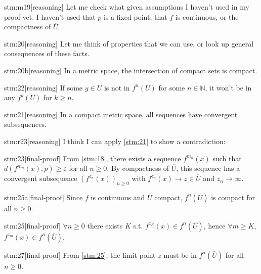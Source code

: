 \documentclass{article}
\begin{document}
\begin{stm}{stm:m19}[reasoning]
Let me check what given assumptions I haven't used in my proof yet. I haven't used that $p$ is a fixed point, that $f$ is continuous, or the compactness of $\overline{U}$.
\end{stm}

\begin{stm}{stm:20}[reasoning]
Let me think of properties that we can use, or look up general consequences of these facts.
\end{stm}

\begin{stm}{stm:20b}[reasoning]
 In a metric space, the intersection of compact sets is compact.
\end{stm}

\begin{stm}{stm:22}[reasoning]
    If some $y \in U$ is not in $f^n(U)$ for some $n \in \mathbb{N}$, it won't be in any $f^k(U)$ for $k \ge n$.
\end{stm}

\begin{stm}{stm:21}[reasoning]
In a compact metric space, all sequences have convergent subsequences.
\end{stm}

\begin{stm}{stm:r23}[reasoning]
I think I can apply \ref{stm:21} to show a contradiction: 
\end{stm}

\begin{stm}{stm:23}[final-proof]
From \ref{stm:18}, there exists a sequence $f^{m_n}(x)$ such that $d(f^{m_n}(x), p) \ge \varepsilon$ for all $n \ge 0$. By compactness of $\overline{U}$, this sequence has a convergent subsequence $(f^{z_n}(x))_{n \ge 0}$ with $f^{z_n}(x) \to z \in \overline{U}$ and $z_n \to \infty$.
\end{stm}

\begin{stm}{stm:25a}[final-proof]
Since $f$ is continuous and $\overline{U}$ compact, $f^n(\overline{U})$ is compact for all $n \ge 0$. 
\end{stm}

\begin{stm}{stm:25}[final-proof]
$\forall n \ge 0$ there exists $K$ s.t. $f^{z_K}(x) \in f^n(\overline{U})$, hence $\forall m \ge K$, $f^{z_m}(x) \in f^n(\overline{U})$.
\end{stm}

\begin{stm}{stm:27}[final-proof]
From \ref{stm:25}, the limit point $z$ must be in $f^n(\overline{U})$ for all $n \ge 0$.
\end{stm}
\end{document}
